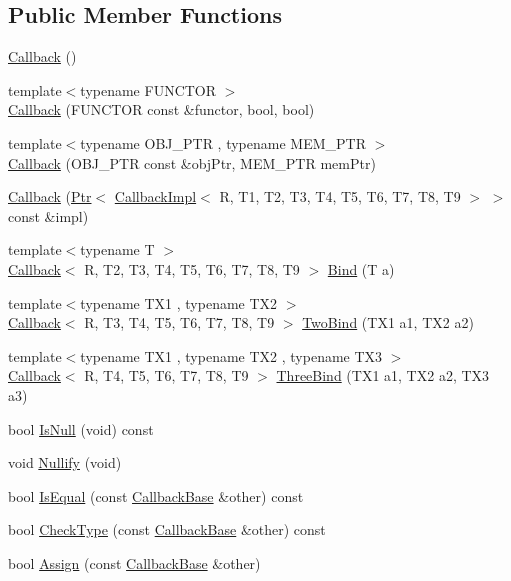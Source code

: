 \subsection*{Public Member Functions}
\begin{DoxyCompactItemize}
\item 
\hyperlink{classns3_1_1Callback_aa3b7bf7ffd1ee6b9e00430196280d728}{Callback} ()
\item 
{\footnotesize template$<$typename F\+U\+N\+C\+T\+OR $>$ }\\\hyperlink{classns3_1_1Callback_a72acf08ac31a297b23cbe89a40897434}{Callback} (F\+U\+N\+C\+T\+OR const \&functor, bool, bool)
\item 
{\footnotesize template$<$typename O\+B\+J\+\_\+\+P\+TR , typename M\+E\+M\+\_\+\+P\+TR $>$ }\\\hyperlink{classns3_1_1Callback_a446edd5cfe925bf3d8ecc14fe4a27f34}{Callback} (O\+B\+J\+\_\+\+P\+TR const \&obj\+Ptr, M\+E\+M\+\_\+\+P\+TR mem\+Ptr)
\item 
\hyperlink{classns3_1_1Callback_a1cd20f88a9997ff366bf7a908ce6cc6a}{Callback} (\hyperlink{classns3_1_1Ptr}{Ptr}$<$ \hyperlink{classns3_1_1CallbackImpl}{Callback\+Impl}$<$ R, T1, T2, T3, T4, T5, T6, T7, T8, T9 $>$ $>$ const \&impl)
\item 
{\footnotesize template$<$typename T $>$ }\\\hyperlink{classns3_1_1Callback}{Callback}$<$ R, T2, T3, T4, T5, T6, T7, T8, T9 $>$ \hyperlink{classns3_1_1Callback_a908ea9399c61230ae472f92be115495d}{Bind} (T a)
\item 
{\footnotesize template$<$typename T\+X1 , typename T\+X2 $>$ }\\\hyperlink{classns3_1_1Callback}{Callback}$<$ R, T3, T4, T5, T6, T7, T8, T9 $>$ \hyperlink{classns3_1_1Callback_a97b9121a2d98f7c53636d689405144ac}{Two\+Bind} (T\+X1 a1, T\+X2 a2)
\item 
{\footnotesize template$<$typename T\+X1 , typename T\+X2 , typename T\+X3 $>$ }\\\hyperlink{classns3_1_1Callback}{Callback}$<$ R, T4, T5, T6, T7, T8, T9 $>$ \hyperlink{classns3_1_1Callback_ad5d86d7cf2b3371e96c0c1ee1597560f}{Three\+Bind} (T\+X1 a1, T\+X2 a2, T\+X3 a3)
\item 
bool \hyperlink{classns3_1_1Callback_aa8e27826badbf37f84763f36f70d9b54}{Is\+Null} (void) const 
\item 
void \hyperlink{classns3_1_1Callback_ab24de4ac458fc5b1ac6f7a672c4c6cea}{Nullify} (void)
\item 
bool \hyperlink{classns3_1_1Callback_aed43f034f270065d2c64e5d46786efe5}{Is\+Equal} (const \hyperlink{classns3_1_1CallbackBase}{Callback\+Base} \&other) const 
\item 
bool \hyperlink{classns3_1_1Callback_a869178e55490b3c2bf1f6386d7d3f33f}{Check\+Type} (const \hyperlink{classns3_1_1CallbackBase}{Callback\+Base} \&other) const 
\item 
bool \hyperlink{classns3_1_1Callback_a246f8949a1392269d4c1a85c24b85f97}{Assign} (const \hyperlink{classns3_1_1CallbackBase}{Callback\+Base} \&other)
\end{DoxyCompactItemize}
